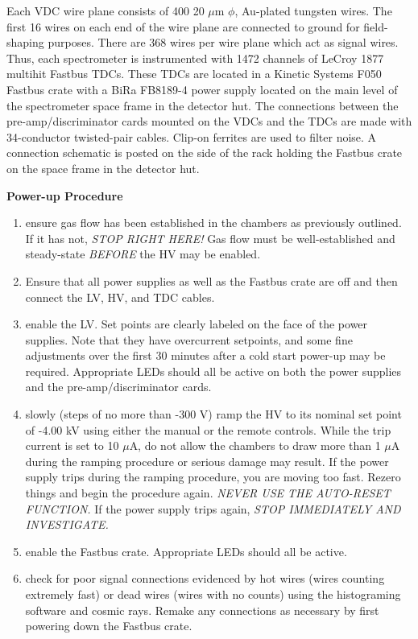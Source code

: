 {Each VDC wire plane consists of 400 20 $\mu$m $\phi$, Au-plated
tungsten wires.  The first 16 wires on each end of the wire plane
are connected to ground for field-shaping purposes.  There are
368 wires per wire plane which act as signal wires.  Thus, each
spectrometer is instrumented with 1472 channels of LeCroy 1877
multihit Fastbus TDCs.  These TDCs are located in a Kinetic Systems
F050 Fastbus crate with a BiRa FB8189-4 power supply located on the 
main level of the spectrometer space frame in
the detector hut.  The connections between the pre-amp/discriminator
cards mounted on the VDCs and the TDCs are made with 34-conductor
twisted-pair cables.  Clip-on ferrites are used to filter noise.
A connection schematic is posted on the side of the rack holding
the Fastbus crate on the space frame in the detector hut.

\begin{center}
{\bf Power-up Procedure}
\end{center}

\begin{enumerate}
\item {ensure gas flow has been established in the chambers as
previously outlined.  If it has not, {\it STOP RIGHT
HERE!}  Gas flow must be well-established and steady-state
{\it BEFORE} the HV may be enabled.}
\item {Ensure that all power supplies as well as the Fastbus crate
are off and then connect the LV, HV, and TDC cables.}
\item {enable the LV.  Set points are clearly labeled on the face of
the power supplies.  Note that they have overcurrent setpoints, and
some fine adjustments over the first 30 minutes after a cold start
power-up may be required.  Appropriate LEDs should all be active on
both the power supplies and the pre-amp/discriminator cards.}
\item {slowly (steps of no more than -300 V) ramp the HV to its
nominal set point of -4.00 kV using either the manual or the remote
controls.  While the trip current is set to 10 $\mu$A, do not allow
the chambers to draw more than 1 $\mu$A during the ramping procedure
or serious damage may result.  If the power supply trips during the
ramping procedure, you are moving too fast.  Rezero things and begin
the procedure again.  {\it NEVER USE THE AUTO-RESET FUNCTION.}}  If
the power supply trips again, {\it STOP IMMEDIATELY AND INVESTIGATE.}
\item {enable the Fastbus crate.  Appropriate LEDs should all be
active.}
\item {check for poor signal connections evidenced by hot wires (wires
counting extremely fast) or dead wires (wires with no counts) using
the histograming software and cosmic rays.  Remake any connections as
necessary by first powering down the Fastbus crate.}
\end{enumerate}

}
